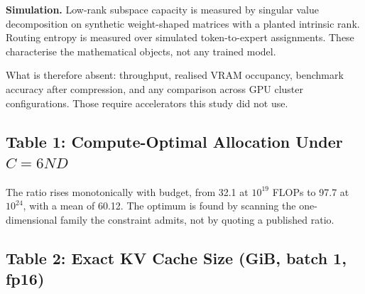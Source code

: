 \documentclass{article}
\begin{document}
\textbf{Simulation.} Low-rank subspace capacity is measured by singular value decomposition on synthetic weight-shaped matrices with a planted intrinsic rank. Routing entropy is measured over simulated token-to-expert assignments. These characterise the mathematical objects, not any trained model.

What is therefore absent: throughput, realised VRAM occupancy, benchmark accuracy after compression, and any comparison across GPU cluster configurations. Those require accelerators this study did not use.


\subsection{Table 1: Compute-Optimal Allocation Under $C = 6ND$}
\begin{table}[htbp]
\centering
{}
\end{table}

The ratio rises monotonically with budget, from 32.1 at $10^{19}$ FLOPs to 97.7 at $10^{24}$, with a mean of 60.12. The optimum is found by scanning the one-dimensional family the constraint admits, not by quoting a published ratio.


\subsection{Table 2: Exact KV Cache Size (GiB, batch 1, fp16)}
\begin{table}[htbp]
\centering
{}
\end{table}
\end{document}
